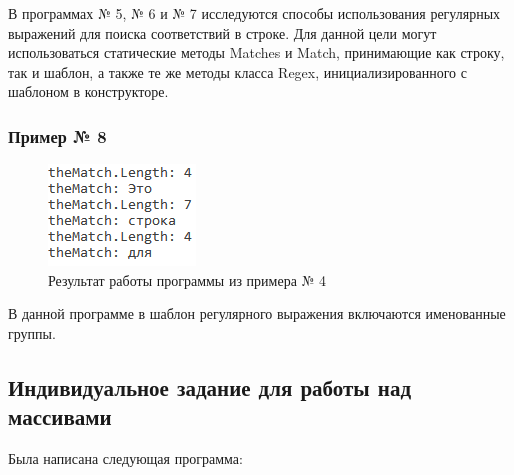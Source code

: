 \documentclass[a4paper,14pt]{extarticle}
\begin{document}
    В программах № 5, № 6 и № 7 исследуются способы использования регулярных выражений
    для поиска соответствий в строке. Для данной цели могут использоваться 
    статические методы Matches и Match, принимающие как строку, так и 
    шаблон, а также те же методы класса Regex, инициализированного с 
    шаблоном в конструкторе.

    \subsubsection{Пример № 8}

    \begin{figure}[H]
        \centering
        \includegraphics[width=.4\textwidth]{Example8}
        \caption{Результат работы программы из примера № 4}
    \end{figure}

    В данной программе в шаблон регулярного выражения включаются именованные группы.

    \subsection{Индивидуальное задание для работы над массивами}

    Была написана следующая программа:
\end{document}
